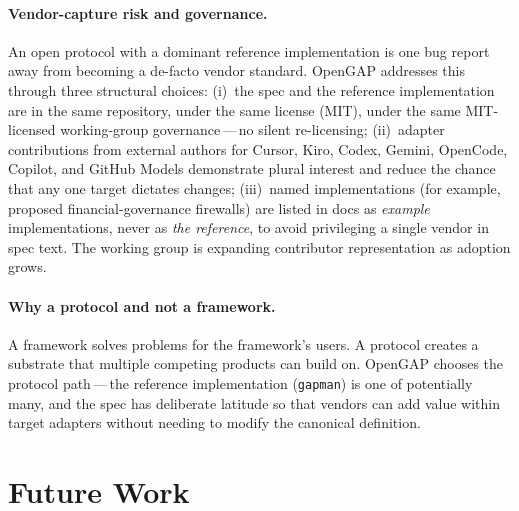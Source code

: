 \documentclass[11pt,a4paper]{article}
\begin{document}
\paragraph{Vendor-capture risk and governance.}
An open protocol with a dominant reference implementation is one bug report away from
becoming a de-facto vendor standard. OpenGAP addresses this through three structural
choices: (i)~the spec and the reference implementation are in the same repository,
under the same license (MIT), under the same MIT-licensed working-group
governance\,---\,no silent re-licensing; (ii)~adapter contributions from external
authors for Cursor, Kiro, Codex, Gemini, OpenCode, Copilot, and GitHub Models
demonstrate plural interest and reduce the chance that any one target dictates
changes; (iii)~named implementations (for example, proposed financial-governance
firewalls) are listed in docs as \emph{example} implementations, never as \emph{the
reference}, to avoid privileging a single vendor in spec text. The working group is
expanding contributor representation as adoption grows.

\paragraph{Why a protocol and not a framework.}
A framework solves problems for the framework's users. A protocol creates a substrate
that multiple competing products can build on. OpenGAP chooses the protocol
path\,---\,the reference implementation (\texttt{gapman}) is one of potentially many,
and the spec has deliberate latitude so that vendors can add value within target
adapters without needing to modify the canonical definition.

\section{Future Work}\label{sec:future}
\end{document}
